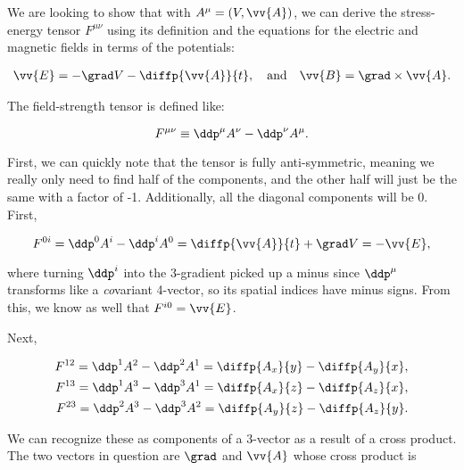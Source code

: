 \section{}

We are looking to show that with $A^{\mu} = (V,\vv{A})$, we can derive the stress-energy tensor $F^{\mu\nu}$ using its definition and the equations for the electric and magnetic fields in terms of the potentials: 

\begin{gather*}
    \vv{E} = -\grad V - \diffp{\vv{A}}{t}, \quad \mathrm{and} \quad \vv{B} = \grad\times\vv{A}.
\end{gather*}

The field-strength tensor is defined like:

\begin{equation*}
    F^{\mu\nu} \equiv \ddp^{\mu}A^{\nu} - \ddp^{\nu}A^{\mu}.
\end{equation*}

First, we can quickly note that the tensor is fully anti-symmetric, meaning we really only need to find half of the components, and the other half will just be the same with a factor of -1. Additionally, all the diagonal components will be 0. First,

\begin{equation*}
    F^{0i} = \ddp^0A^i - \ddp^iA^0 = \diffp{\vv{A}}{t} + \grad V = -\vv{E},
\end{equation*}

where turning $\ddp^i$ into the 3-gradient picked up a minus since $\ddp^{\mu}$ transforms like a \textit{co}variant 4-vector, so its spatial indices have minus signs. From this, we know as well that $F^{i0} = \vv{E}$.

Next,

\begin{align*}
    F^{12} = \ddp^1A^2 - \ddp^2A^1 = \diffp{A_x}{y} - \diffp{A_y}{x}, \\
    F^{13} = \ddp^1A^3 - \ddp^3A^1 = \diffp{A_x}{z} - \diffp{A_z}{x}, \\
    F^{23} = \ddp^2A^3 - \ddp^3A^2 = \diffp{A_y}{z} - \diffp{A_z}{y}.
\end{align*}

We can recognize these as components of a 3-vector as a result of a cross product. The two vectors in question are $\grad$ and $\vv{A}$ whose cross product is

